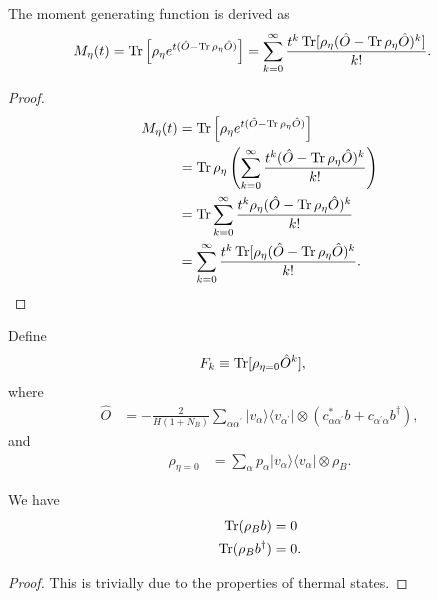 \documentclass[../../note.tex]{subfiles}
\begin{document}
\begin{lemma}[MGF]
    The moment generating function is derived as
    \begin{align}
        M_{\eta}(t) 
        &= \operatorname{Tr}\left[\rho_{\eta} e^{t (\hat{O} - \operatorname{Tr} \rho_{\eta} \hat{O})}\right] 
        = \sum_{k=0}^{\infty} \frac{t^k \operatorname{Tr}[\rho_{\eta} (\hat{O} - \operatorname{Tr} \rho_{\eta} \hat{O})^k]}{k!}.
    \end{align}
\end{lemma}
\begin{proof}
    \begin{align}
        M_{\eta}(t) 
        &= \operatorname{Tr}\left[\rho_{\eta} e^{t (\hat{O} - \operatorname{Tr} \rho_{\eta} \hat{O})}\right] \\
        &= \operatorname{Tr} \rho_{\eta} \left( \sum_{k=0}^{\infty} \frac{t^k (\hat{O} - \operatorname{Tr} \rho_{\eta} \hat{O})^k}{k!} \right) \\
        &= \operatorname{Tr} \sum_{k=0}^{\infty} \frac{t^k \rho_{\eta} (\hat{O} - \operatorname{Tr} \rho_{\eta} \hat{O})^k}{k!} \\
        &= \sum_{k=0}^{\infty} \frac{t^k \operatorname{Tr}[\rho_{\eta} (\hat{O} - \operatorname{Tr} \rho_{\eta} \hat{O})^k}{k!}.
    \end{align}
\end{proof}

\begin{definition}
    Define
    \begin{align}
        F_k
        &\equiv \operatorname{Tr}[\rho_{\eta = 0} \hat{O}^k],
    \end{align}
    where 
    \begin{align}
        \hat{O}
        &= -\frac{2}{H(1+N_B)} \sum_{\alpha \alpha^\prime} \vert v_{\alpha} \rangle \langle v_{\alpha^\prime} \vert \otimes (c^\ast_{\alpha \alpha^\prime} b + c_{\alpha^\prime \alpha} b^\dagger),
    \end{align}
    and
    \begin{align}
        \rho_{\eta=0}
        &= \sum_{\alpha} p_{\alpha} \vert v_{\alpha} \rangle \langle v_{\alpha} \vert \otimes \rho_B.
    \end{align}
\end{definition}

\begin{lemma}
    We have
    \begin{align}
        \operatorname{Tr}(\rho_B b) 
        &= 0 \\ 
        \operatorname{Tr}(\rho_B b^\dagger)
        &= 0.
    \end{align}
\end{lemma}
\begin{proof}
    This is trivially due to the properties of thermal states.
\end{proof}
\end{document}
